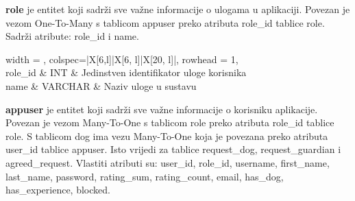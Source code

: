 			
			\textbf{role} je entitet koji sadrži sve važne informacije o ulogama u  aplikaciji. Povezan je vezom One-To-Many s tablicom appuser preko atributa role\_id tablice role. Sadrži atribute: role\_id i name.
			
			
			
			
			\begin{longtblr}[
				label=none,
				entry=none
				]{
					width = \textwidth,
					colspec={|X[6,l]|X[6, l]|X[20, l]|}, 
					rowhead = 1,
				} %
				\hline {}	 \\ \hline[3pt]
				role\_id	& INT &  Jedinstven identifikator uloge korisnika 	\\ \hline
				name & VARCHAR &  Naziv uloge u sustavu \\ \hline
			 
			\end{longtblr}
			
			\textbf{appuser} je entitet koji sadrži sve važne informacije o korisniku aplikacije. Povezan je vezom Many-To-One s tablicom role preko atributa role\_id tablice role. S tablicom dog ima vezu Many-To-One koja je povezana preko atributa user\_id tablice appuser. Isto vrijedi za tablice request\_dog, request\_guardian i agreed\_request. Vlastiti atributi su: user\_id, role\_id, username, first\_name, last\_name, password, rating\_sum, rating\_count, email, has\_dog, has\_experience, blocked.

				
				
